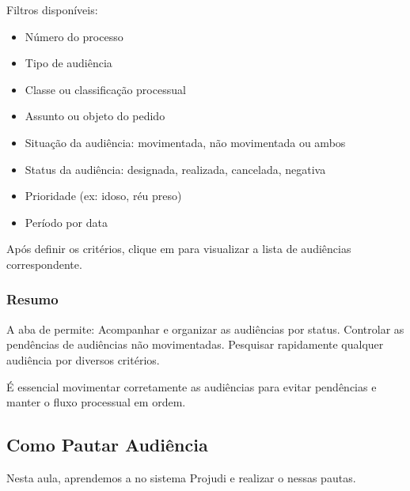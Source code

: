 \documentclass[letterpaper,10pt,brazil]{sphinxmanual}
\begin{document}
\sphinxAtStartPar
Filtros disponíveis:
\begin{itemize}
\item {} 
\sphinxAtStartPar
Número do processo

\item {} 
\sphinxAtStartPar
Tipo de audiência

\item {} 
\sphinxAtStartPar
Classe ou classificação processual

\item {} 
\sphinxAtStartPar
Assunto ou objeto do pedido

\item {} 
\sphinxAtStartPar
Situação da audiência: movimentada, não movimentada ou ambos

\item {} 
\sphinxAtStartPar
Status da audiência: designada, realizada, cancelada, negativa

\item {} 
\sphinxAtStartPar
Prioridade (ex: idoso, réu preso)

\item {} 
\sphinxAtStartPar
Período por data

\end{itemize}

\sphinxAtStartPar
Após definir os critérios, clique em  para visualizar a lista de audiências correspondente.


\subsubsection{Resumo}
\label{\detokenize{projud_45_listasaudiencias:resumo}}
\sphinxAtStartPar
A aba de  permite:
\sphinxhyphen{} Acompanhar e organizar as audiências por status.
\sphinxhyphen{} Controlar as pendências de audiências não movimentadas.
\sphinxhyphen{} Pesquisar rapidamente qualquer audiência por diversos critérios.

\sphinxAtStartPar
É essencial movimentar corretamente as audiências para evitar pendências e manter o fluxo processual em ordem.

\sphinxstepscope


\subsection{Como Pautar Audiência}
\label{\detokenize{projud_46_comopautaraudiencia:como-pautar-audiencia}}\label{\detokenize{projud_46_comopautaraudiencia::doc}}
\sphinxAtStartPar
Nesta aula, aprendemos a  no sistema Projudi e realizar o  nessas pautas.
\end{document}
